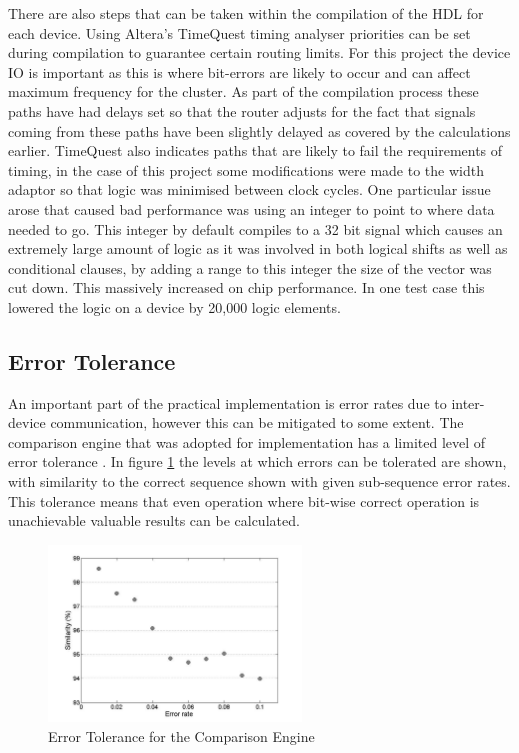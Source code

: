 There are also steps that can be taken within the compilation of the HDL for each device. Using Altera's TimeQuest timing analyser priorities can be set during compilation to guarantee certain routing limits. For this project the device IO is important as this is where bit-errors are likely to occur and can affect maximum frequency for the cluster. As part of the compilation process these paths have had delays set so that the router adjusts for the fact that signals coming from these paths have been slightly delayed as covered by the calculations earlier. TimeQuest also indicates paths that are likely to fail the requirements of timing, in the case of this project some modifications were made to the width adaptor so that logic was minimised between clock cycles. One particular issue arose that caused bad performance was using an integer to point to where data needed to go. This integer by default compiles to a 32 bit signal which causes an extremely large amount of logic as it was involved in both logical shifts as well as conditional clauses, by adding a range to this integer the size of the vector was cut down. This massively increased on chip performance. In one test case this lowered the logic on a device by 20,000 logic elements.

\subsection{Error Tolerance}

An important part of the practical implementation is error rates due to inter-device communication, however this can be mitigated to some extent. The comparison engine that was adopted for implementation has a limited level of error tolerance \cite{hu2012cmos}. In figure \ref{fig:err} the levels at which errors can be tolerated are shown, with similarity to the correct sequence shown with given sub-sequence error rates. This tolerance means that even operation where bit-wise correct operation is unachievable valuable results can be calculated.

\begin{figure}[h!]
\centering
  \includegraphics[width=0.6\textwidth]{./figs/error_correction.pdf}
  \caption{Error Tolerance for the Comparison Engine \cite{hu2012cmos}}
  \label{fig:err}
\end{figure}

